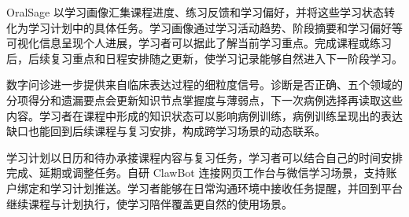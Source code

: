 OralSage 以学习画像汇集课程进度、练习反馈和学习偏好，并将这些学习状态转化为学习计划中的具体任务。学习画像通过学习活动趋势、阶段摘要和学习偏好等可视化信息呈现个人进展，学习者可以据此了解当前学习重点。完成课程或练习后，后续复习重点和日程安排随之更新，使学习记录能够自然进入下一阶段学习。

数字问诊进一步提供来自临床表达过程的细粒度信号。诊断是否正确、五个领域的分项得分和遗漏要点会更新知识节点掌握度与薄弱点，下一次病例选择再读取这些内容。学习者在课程中形成的知识状态可以影响病例训练，病例训练呈现出的表达缺口也能回到后续课程与复习安排，构成跨学习场景的动态联系。

学习计划以日历和待办承接课程内容与复习任务，学习者可以结合自己的时间安排完成、延期或调整任务。自研 ClawBot 连接网页工作台与微信学习场景，支持账户绑定和学习计划推送。学习者能够在日常沟通环境中接收任务提醒，并回到平台继续课程与计划执行，使学习陪伴覆盖更自然的使用场景。
